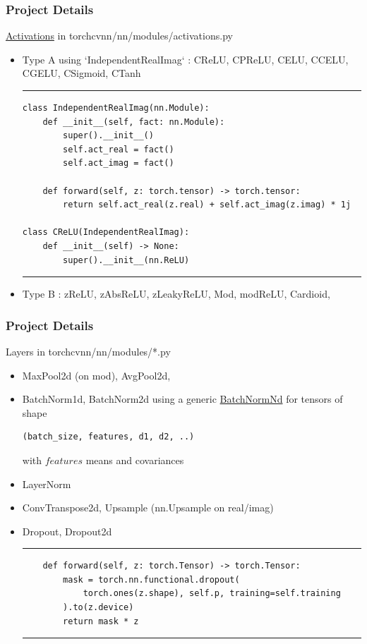 \documentclass[aspectratio=169,10pt]{beamer}
\begin{document}
\begin{frame}[fragile]
\frametitle{Project Details}

\begin{block}{\href{https://jeremyfix.github.io/torchcvnn/reference/torchcvnn/nn/modules/activation/}{Activations} in torchcvnn/nn/modules/activations.py}
\begin{itemize}
\item Type A using `IndependentRealImag` : CReLU, CPReLU, CELU, CCELU, CGELU, CSigmoid, CTanh
\rule{\textwidth}{1pt}
\scriptsize
\begin{verbatim}
class IndependentRealImag(nn.Module):
    def __init__(self, fact: nn.Module):
        super().__init__()
        self.act_real = fact()
        self.act_imag = fact()
        
    def forward(self, z: torch.tensor) -> torch.tensor:
        return self.act_real(z.real) + self.act_imag(z.imag) * 1j
    
class CReLU(IndependentRealImag):
    def __init__(self) -> None:
        super().__init__(nn.ReLU)
\end{verbatim}
\rule{\textwidth}{1pt}
\normalsize
\item Type B : zReLU, zAbsReLU, zLeakyReLU, Mod, modReLU, Cardioid, 
\end{itemize}
\end{block}

\end{frame}



\begin{frame}[fragile]
\frametitle{Project Details}

\begin{block}{Layers in torchcvnn/nn/modules/*.py}
\begin{itemize}
    \item MaxPool2d (on mod), AvgPool2d, 
    \item BatchNorm1d, BatchNorm2d using a generic \href{https://github.com/jeremyfix/torchcvnn/blob/ede98e115649fcfc4f6098c6fefee758b4580449/src/torchcvnn/nn/modules/batchnorm.py#L151}{BatchNormNd} for tensors of shape \begin{verbatim}(batch_size, features, d1, d2, ..)\end{verbatim} with $features$ means and covariances
    \item LayerNorm 
    \item ConvTranspose2d, Upsample (nn.Upsample on real/imag)
    \item Dropout, Dropout2d
\rule{\textwidth}{1pt}
\scriptsize
\begin{verbatim}
    def forward(self, z: torch.Tensor) -> torch.Tensor:
        mask = torch.nn.functional.dropout(
            torch.ones(z.shape), self.p, training=self.training
        ).to(z.device)
        return mask * z
\end{verbatim}
\rule{\textwidth}{1pt}
\normalsize    
\end{itemize}


\end{block}

\end{frame}
\end{document}
